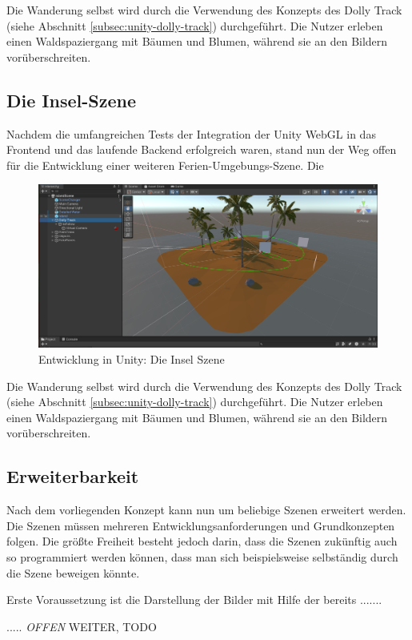 Die Wanderung selbst wird durch die Verwendung des Konzepts des Dolly Track (siehe Abschnitt \ref{subsec:unity-dolly-track}) durchgeführt. Die Nutzer erleben einen Waldspaziergang mit Bäumen und Blumen, während sie an den Bildern vorüberschreiten.


\subsection{Die Insel-Szene}

Nachdem die umfangreichen Tests der Integration der Unity WebGL in das Frontend und das laufende Backend erfolgreich waren, stand nun der Weg offen für die Entwicklung einer weiteren Ferien-Umgebungs-Szene. Die   


\begin{figure} [h t]
    \centering
    \includegraphics[scale=0.15]{pics/unity-edit-island.png}
    \caption{Entwicklung in Unity: Die Insel Szene}
    \label{fig:unity-edit-island}
\end{figure}


Die Wanderung selbst wird durch die Verwendung des Konzepts des Dolly Track (siehe Abschnitt \ref{subsec:unity-dolly-track}) durchgeführt. Die Nutzer erleben einen Waldspaziergang mit Bäumen und Blumen, während sie an den Bildern vorüberschreiten.


\subsection{Erweiterbarkeit}
\label{subsec:unity-erweiterbarkeit}

Nach dem vorliegenden Konzept kann nun um beliebige Szenen erweitert werden. Die Szenen müssen mehreren Entwicklungsanforderungen und Grundkonzepten folgen. Die größte Freiheit besteht jedoch darin, dass die Szenen zukünftig auch so programmiert werden können, dass man sich beispielsweise selbständig durch die Szene beweigen könnte.

Erste Voraussetzung ist die Darstellung der Bilder mit Hilfe der bereits .......


..... \emph{OFFEN} WEITER, TODO

